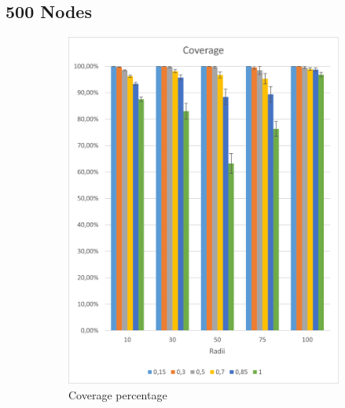 \subsection{500 Nodes}
\begin{figure}[H]
\centering
\begin{subfigure}{.5\textwidth}
  \centering
  \includegraphics[width=1\linewidth]{./images/500CoverageCI.png}
  \caption{Coverage percentage}
  \label{fig:sub1}
\end{subfigure}%
\begin{subfigure}{.5\textwidth}
  \centering

\end{subfigure}
\end{figure}
